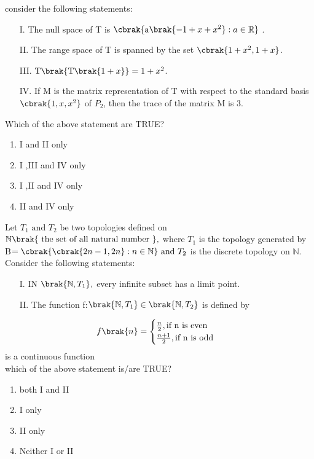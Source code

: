 consider the following statements:
\begin{itemize}
    \item[I.] The null space of  T is $\cbrak{\text{a}\brak{-1 + x + x^{2}} : a \in \mathbb{R}}$ .
    
    \item[II.] The range space of T  is spanned by the set $\cbrak{1+x^{2},1+x}$.
    
    \item[III.] $\text{T}\brak{\text{T}\brak{1+x}}=1+x^{2}$.
    
    \item[IV.] If M is the matrix representation of T with respect to the standard basis $\cbrak{1,x,x^{2}}$ of $P_{2}$, then the trace of the matrix M is 3.
\end{itemize}
Which of the above statement are TRUE?
\begin{multicols}{2}
    \begin{enumerate}
         \item I and II only 
         \item I ,III and IV only 
         \item I ,II and IV only 
        \item  II and IV only 
    \end{enumerate}
\end{multicols}   
\bigskip
\item Let $T_{1}\text{ and }T_{2}$ be two topologies defined on $\mathbb{N}\brak{\text{ the set of all natural number }},$ where $T_{1}$ is the topology  generated by B$=\cbrak{\cbrak{2n-1,2n}:n\in \mathbb{N}}\text{ and }T_{2}$ is the discrete  topology on $\mathbb{N}$.
Consider the following  statements:
\begin{itemize}
    \item [I.] IN $\brak{\mathbb{N},T_{1}},$ every infinite subset has a limit point.
    \item [II.] The function f:$\brak{\mathbb{N},T_{1}}\in\brak{\mathbb{N},T_{2}}$ is defined by
\end{itemize}
\begin{align*}
    f\brak{n}=\begin{cases} 
    \frac{n}{2},\text{if n is even}\\
    \frac{n+1}{2},\text{if n is odd}
\end{cases}
\end{align*}
is a continuous function\\
which of the above statement is/are TRUE?
\begin{multicols}{2}
    \begin{enumerate}
         \item  both I and II  
         \item I  only 
         \item II  only 
        \item  Neither I or II 
    \end{enumerate}
\end{multicols}   
